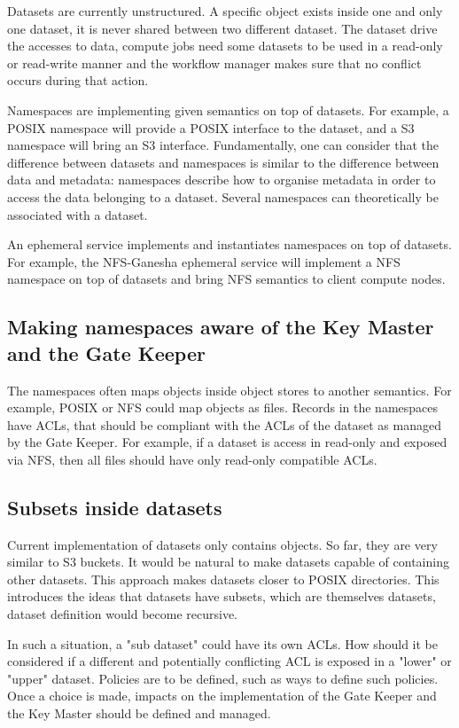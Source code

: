 Datasets are currently unstructured. A specific object exists inside one and only one dataset, it is never shared
between two different dataset. The dataset drive the accesses to data, compute jobs need some datasets to be 
used in a read-only or read-write manner and the workflow manager makes sure that no conflict occurs during that 
action. 

Namespaces are implementing given semantics on top of datasets. For example, a POSIX namespace will provide a 
POSIX interface to the dataset, and a S3 namespace will bring an S3 interface. Fundamentally, one can consider
that the difference between datasets and namespaces is similar to the difference between data and metadata: 
namespaces describe how to organise metadata in order to access the data belonging to a dataset. Several 
namespaces can theoretically be associated with a dataset. 

An ephemeral service implements and instantiates namespaces on top of datasets. For example, the NFS-Ganesha
ephemeral service will implement a NFS namespace on top of datasets and bring NFS semantics to client compute 
nodes. 

\subsection{Making namespaces aware of the Key Master and the Gate Keeper}

The namespaces often maps objects inside object stores to another semantics. For example, POSIX or NFS could map 
objects as files. Records in the namespaces have ACLs, that should be compliant with the ACLs of the dataset as
managed by the Gate Keeper. For example, if a dataset is access in read-only and exposed via NFS, then all files
should have only read-only compatible ACLs. 

\subsection{Subsets inside datasets}

Current implementation of datasets only contains objects. So far, they are very similar to S3 buckets. It would
be natural to make datasets capable of containing other datasets. This approach makes datasets closer to POSIX
directories. This introduces the ideas that datasets have subsets, which are themselves datasets, dataset 
definition would become recursive.

In such a situation, a "sub dataset" could have its own ACLs. How should it be considered if a different and
potentially conflicting ACL is exposed in a "lower" or "upper" dataset. Policies are to be defined, such as 
ways to define such policies. Once a choice is made, impacts on the implementation of the Gate Keeper and the 
Key Master should be defined and managed. 

